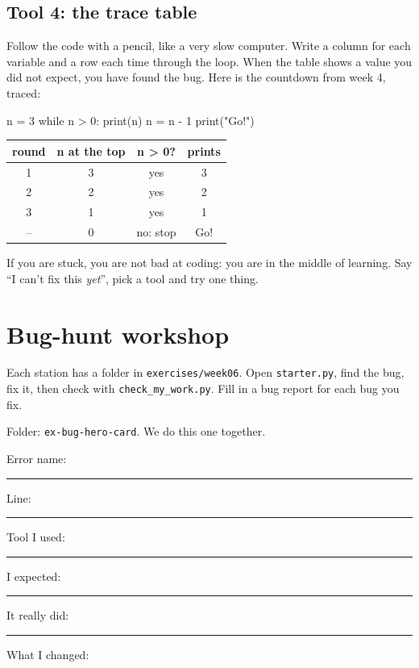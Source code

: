\subsection{Tool 4: the trace table}
Follow the code with a pencil, like a very slow computer. Write a column for each variable and a row each time through the loop.
When the table shows a value you did not expect, you have found the bug.
Here is the countdown from week 4, traced:
\begin{center}
\begin{minipage}{0.4\linewidth}
\begin{pycode}
n = 3
while n > 0:
    print(n)
    n = n - 1
print("Go!")
\end{pycode}
\end{minipage}\hfill
\begin{minipage}{0.52\linewidth}
\renewcommand{\arraystretch}{1.3}
\begin{tabular}{|c|c|c|c|}
\hline \textbf{round} & \textbf{n at the top} & \textbf{n > 0?} & \textbf{prints} \\ \hline
1 & 3 & yes & 3 \\ \hline
2 & 2 & yes & 2 \\ \hline
3 & 1 & yes & 1 \\ \hline
-- & 0 & no: stop & Go! \\ \hline
\end{tabular}
\end{minipage}
\end{center}

\begin{tip}
If you are stuck, you are not bad at coding: you are in the middle of learning. Say \enquote{I can't fix this \emph{yet}}, pick a tool and try one thing.
\end{tip}

\section{Bug-hunt workshop}
Each station has a folder in \texttt{exercises/week06}. Open \texttt{starter.py}, find the bug, fix it, then check with \texttt{check\_my\_work.py}.
Fill in a bug report for each bug you fix.

\begin{exercise}
Folder: \texttt{ex-bug-hero-card}. We do this one together.\par
Error name: \rule{4cm}{0.4pt}\quad Line: \rule{1.5cm}{0.4pt}\quad Tool I used: \rule{3.5cm}{0.4pt}\par
I expected: \rule{5cm}{0.4pt}\quad It really did: \rule{5cm}{0.4pt}\par
What I changed: 
\end{exercise}

